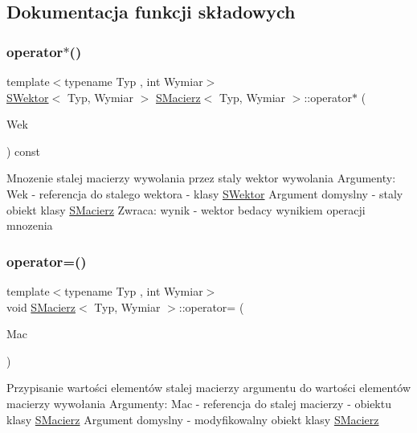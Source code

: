 \subsection{Dokumentacja funkcji składowych}
\mbox{\label{classSMacierz_ae72c507f32c5ce3db5ded6acacc64bc3}} 
\subsubsection{\texorpdfstring{operator$\ast$()}{operator*()}}
{\footnotesize\ttfamily template$<$typename Typ , int Wymiar$>$ \\
\hyperlink{classSWektor}{S\+Wektor}$<$ Typ, Wymiar $>$ \hyperlink{classSMacierz}{S\+Macierz}$<$ Typ, Wymiar $>$\+::operator$\ast$ (\begin{DoxyParamCaption}\item[{const \hyperlink{classSWektor}{S\+Wektor}$<$ Typ, Wymiar $>$ \&}]{Wek }\end{DoxyParamCaption}) const}

Mnozenie stalej macierzy wywolania przez staly wektor wywolania Argumenty\+: Wek -\/ referencja do stalego wektora -\/ klasy \hyperlink{classSWektor}{S\+Wektor} Argument domyslny -\/ staly obiekt klasy \hyperlink{classSMacierz}{S\+Macierz} Zwraca\+: wynik -\/ wektor bedacy wynikiem operacji mnozenia \mbox{\label{classSMacierz_a3dd718281652814e45a5fe17f2c33b05}} 
\subsubsection{\texorpdfstring{operator=()}{operator=()}}
{\footnotesize\ttfamily template$<$typename Typ , int Wymiar$>$ \\
void \hyperlink{classSMacierz}{S\+Macierz}$<$ Typ, Wymiar $>$\+::operator= (\begin{DoxyParamCaption}\item[{const \hyperlink{classSMacierz}{S\+Macierz}$<$ Typ, Wymiar $>$ \&}]{Mac }\end{DoxyParamCaption})}

Przypisanie wartości elementów stalej macierzy argumentu do wartości elementów macierzy wywołania Argumenty\+: Mac -\/ referencja do stalej macierzy -\/ obiektu klasy \hyperlink{classSMacierz}{S\+Macierz} Argument domyslny -\/ modyfikowalny obiekt klasy \hyperlink{classSMacierz}{S\+Macierz} \mbox{\label{classSMacierz_aca41f9c5eaf53fdb6ddb5f065f816fcd}} 
